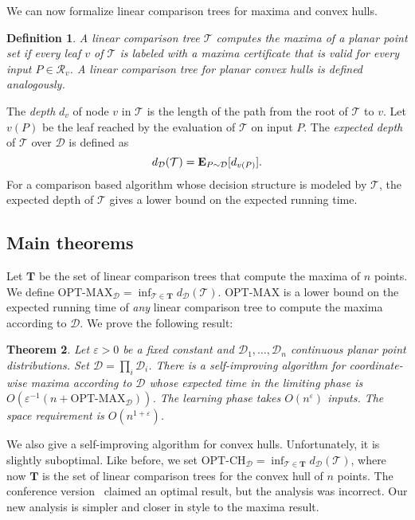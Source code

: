 \documentclass[letterpaper,11pt]{article}
\newtheorem{theorem}{Theorem}[section]
\newtheorem{definition}[theorem]{Definition}
\newcommand{\eps}{\varepsilon}
\newcommand{\EX}{\hbox{\bf E}}
\newcommand{\OPTMAX}{\text{OPT-MAX}}
\newcommand{\OPTCH}{\text{OPT-CH}}
\newcommand{\bT}{\textbf{T}}
\newcommand{\cD}{\mathcal{D}}
\newcommand{\cR}{\mathcal{R}}
\newcommand{\cT}{\mathcal{T}}
\begin{document}
We can now formalize linear
comparison trees for maxima and
convex hulls.

\begin{definition}
  A  linear comparison tree $\cT$ 
  \emph{computes the maxima
  of a planar point set} if
  every leaf $v$ of $\cT$ is labeled
  with a maxima certificate that is 
  valid for every input $P \in \cR_v$.
  A linear comparison tree for planar
  convex hulls is defined analogously.
\end{definition}

The \emph{depth} $d_v$ of node $v$ in $\cT$ 
is the length of the path from the root 
of $\cT$ to $v$.  Let $v(P)$  be the 
leaf reached by the evaluation of 
$\cT$ on input $P$.  The 
\emph{expected depth} of $\cT$ over 
$\cD$ is defined as 
\[
  d_\cD(\cT) = \EX_{P \sim \cD}[d_{v(P)}]. 
\]
For a comparison based algorithm whose
decision structure is modeled by $\cT$, 
the expected depth of $\cT$ gives a lower
bound on the expected running time.


\subsection{Main theorems}

Let $\bT$ be the set of linear comparison
trees that compute the maxima of $n$ points.
We define $\OPTMAX_\cD = \inf_{\cT \in \bT} d_\cD(\cT)$.
$\OPTMAX$ is a lower bound on the 
expected running time of \emph{any} linear
comparison tree to compute the maxima 
according to $\cD$. We prove the following
result:


\begin{theorem}\label{thm:main-max} 
  Let $\eps > 0$ be a fixed constant and 
  $\cD_1, \dots, \cD_n$ continuous planar point 
  distributions. Set $\cD = \prod_i \cD_i$.
  There is a self-improving algorithm for 
  coordinate-wise maxima according to $\cD$
  whose expected time in the limiting phase is 
  $O(\eps^{-1}(n + \OPTMAX_\cD))$. 
  The learning phase takes $O(n^\eps)$ inputs. 
  The space requirement is $O(n^{1+\eps})$.
\end{theorem}

We also give a self-improving algorithm 
for convex hulls. Unfortunately, it is 
slightly suboptimal. Like before, we set 
$\OPTCH_\cD = \inf_{\cT \in \bT} d_\cD(\cT)$, 
where now $\bT$ is the set of linear comparison 
trees for the convex hull of $n$ points. 
The conference version~\cite{ClarksonMuSe10}
claimed an optimal result, but the analysis was incorrect. Our new analysis is simpler and 
closer in style to the maxima result.
\end{document}
